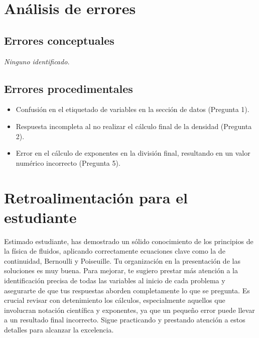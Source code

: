 \documentclass[11pt,a4paper]{article}
\begin{document}
\section*{Análisis de errores}

\subsection*{Errores conceptuales}
\textit{Ninguno identificado.}

\subsection*{Errores procedimentales}
\begin{itemize}[leftmargin=1.5em, itemsep=2pt]
  \item Confusión en el etiquetado de variables en la sección de datos (Pregunta 1).
  \item Respuesta incompleta al no realizar el cálculo final de la densidad (Pregunta 2).
  \item Error en el cálculo de exponentes en la división final, resultando en un valor numérico incorrecto (Pregunta 5).
\end{itemize}

\section*{Retroalimentación para el estudiante}
\begin{tcolorbox}[cajaRecomendacion, title={Dirigido a: yilselys betancourt 33385584}]
Estimado estudiante, has demostrado un sólido conocimiento de los principios de la física de fluidos, aplicando correctamente ecuaciones clave como la de continuidad, Bernoulli y Poiseuille. Tu organización en la presentación de las soluciones es muy buena. Para mejorar, te sugiero prestar más atención a la identificación precisa de todas las variables al inicio de cada problema y asegurarte de que tus respuestas aborden completamente lo que se pregunta. Es crucial revisar con detenimiento los cálculos, especialmente aquellos que involucran notación científica y exponentes, ya que un pequeño error puede llevar a un resultado final incorrecto. Sigue practicando y prestando atención a estos detalles para alcanzar la excelencia.
\end{tcolorbox}
\end{document}
